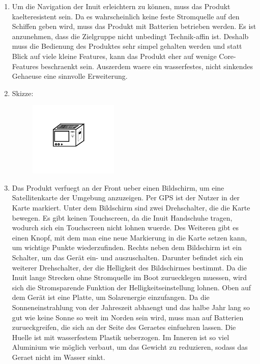 \documentclass[a4paper,10pt]{article}
\begin{document}
\kopf
\renewcommand{\figurename}{Figure}

\begin{enumerate}

\item Um die Navigation der Inuit erleichtern zu können, muss das Produkt kaelteresistent sein. Da es wahrscheinlich keine feste Stromquelle auf den Schiffen geben wird, muss das Produkt mit Batterien betrieben werden. Es ist anzunehmen, dass die Zielgruppe nicht unbedingt Technik-affin ist. Deshalb muss die Bedienung des Produktes sehr simpel gehalten werden und statt Blick auf viele kleine Features, kann das Produkt eher auf wenige Core-Features beschraenkt sein. Auszerdem waere ein wasserfestes, nicht sinkendes Gehaeuse eine sinnvolle Erweiterung.

\item Skizze:

\begin{figure}[ht]
\centering \includegraphics[width=0.4\textwidth]{images/produkt.png}
\end{figure}

\item Das Produkt verfuegt an der Front ueber einen Bildschirm, um eine Satellitenkarte der Umgebung anzuzeigen. Per GPS ist der Nutzer in der Karte markiert. Unter dem Bildschirm sind zwei Drehschalter, die die Karte bewegen. Es gibt keinen Touchscreen, da die Inuit Handschuhe tragen, wodurch sich ein Touchscreen nicht lohnen wuerde. Des Weiteren gibt es einen Knopf, mit dem man eine neue Markierung in die Karte setzen kann, um wichtige Punkte wiederzufinden. Rechts neben dem Bildschirm ist ein Schalter, um das Gerät ein- und auszuschalten. Darunter befindet sich ein weiterer Drehschalter, der die Helligkeit des Bildschirmes bestimmt. Da die Inuit lange Strecken ohne Stromquelle im Boot zuruecklegen muessen, wird sich die Stromsparende Funktion der Helligkeitseinstellung lohnen. Oben auf dem Gerät ist eine Platte, um Solarenergie einzufangen. Da die Sonneneinstrahlung von der Jahreszeit abhaengt und das halbe Jahr lang so gut wie keine Sonne so weit im Norden sein wird, muss man auf Batterien zurueckgreifen, die sich an der Seite des Geraetes einfuehren lassen. Die Huelle ist mit wasserfestem Plastik ueberzogen. Im Inneren ist so viel Aluminium wie möglich verbaut, um das Gewicht zu reduzieren, sodass das Geraet nicht im Wasser sinkt. 

\end{enumerate}
\end{document}
